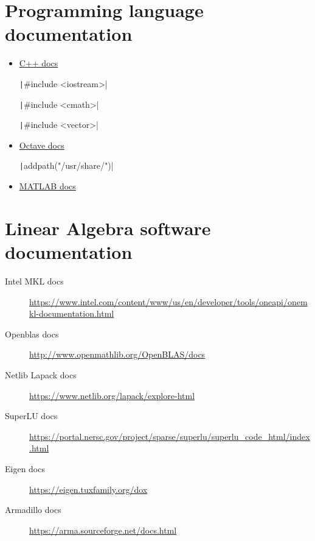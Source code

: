 \section{Programming language documentation}

\begin{itemize}
	\item \href{https://en.cppreference.com}{C++ docs}

	      \texttt|#include <iostream>|

	      \texttt|#include <cmath>|

	      \texttt|#include <vector>|

	\item \href{https://docs.octave.org}{Octave docs}

	      \texttt|addpath("/usr/share/")|

	\item \href{https://www.mathworks.com/help/matlab/index.html}{MATLAB docs}
\end{itemize}

\section{Linear Algebra software documentation}

\begin{description}
	\item[Intel MKL docs]

	      \url{https://www.intel.com/content/www/us/en/developer/tools/oneapi/onemkl-documentation.html}

	\item[Openblas docs]

	      \url{http://www.openmathlib.org/OpenBLAS/docs}

	\item[Netlib Lapack docs]

	      \url{https://www.netlib.org/lapack/explore-html}

	\item[SuperLU docs]

	      \url{https://portal.nersc.gov/project/sparse/superlu/superlu_code_html/index.html}

	\item[Eigen docs]

	      \url{https://eigen.tuxfamily.org/dox}

	\item[Armadillo docs]
	      \url{https://arma.sourceforge.net/docs.html}
\end{description}

